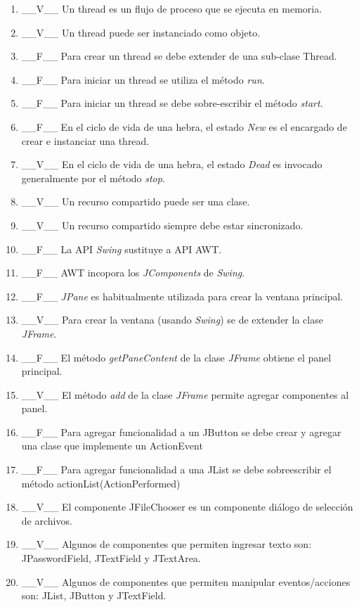 \documentclass[10pt]{article}
\begin{document}
{\begin{enumerate}
		\begin{enumerate}
            \item \_\_V\_\_ Un thread es un flujo de proceso que se ejecuta en memoria.
            \item \_\_V\_\_ Un thread puede ser instanciado como objeto.
            \item \_\_F\_\_ Para crear un thread se debe extender de una sub-clase Thread.
            \item \_\_F\_\_ Para iniciar un thread se utiliza el m\'etodo \emph{run}. 
            \item \_\_F\_\_ Para iniciar un thread se debe sobre-escribir el m\'etodo \emph{start}.
            \item \_\_F\_\_ En el ciclo de vida de una hebra, el estado \emph{New} es el encargado de crear e instanciar una thread.
            \item \_\_V\_\_ En el ciclo de vida de una hebra, el estado \emph{Dead} es invocado generalmente por el m\'etodo \emph{stop}.
            \item \_\_V\_\_ Un recurso compartido puede ser una clase.
            \item \_\_V\_\_ Un recurso compartido siempre debe estar sincronizado.
            \item \_\_F\_\_ La API \emph{Swing} sustituye a API AWT.
            \item \_\_F\_\_ AWT incopora los \emph{JComponents} de \emph{Swing}.
            \item \_\_F\_\_ \emph{JPane} es habitualmente utilizada para crear la ventana principal.
            \item \_\_V\_\_ Para crear la ventana (usando \emph{Swing}) se de extender la clase \emph{JFrame}.
            \item \_\_F\_\_ El m\'etodo \emph{getPaneContent} de la clase \emph{JFrame} obtiene el panel principal.
            \item \_\_V\_\_ El m\'etodo \emph{add} de la clase \emph{JFrame} permite agregar componentes al panel.
            \item \_\_F\_\_ Para agregar funcionalidad a un JButton se debe crear y agregar una clase que implemente un ActionEvent
            \item \_\_F\_\_ Para agregar funcionalidad a una JList se debe sobreescribir el m\'etodo actionList(ActionPerformed)
            \item \_\_V\_\_ El componente JFileChooser es un componente di\'alogo de selecci\'on de archivos.
            \item \_\_V\_\_ Algunos de componentes que permiten ingresar texto son: JPasswordField, JTextField y JTextArea.
            \item \_\_V\_\_ Algunos de componentes que permiten manipular eventos/acciones son: JList, JButton y JTextField.
        \end{enumerate}


\end{enumerate}}
\end{document}
